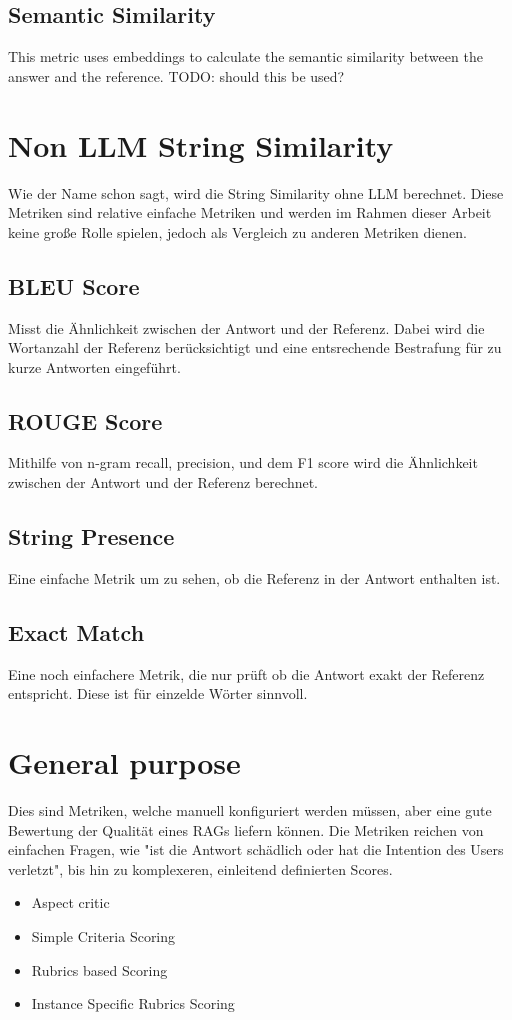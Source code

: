 \subsection{Semantic Similarity}
This metric uses embeddings to calculate the semantic similarity between the answer and the reference. TODO: should this be used?

\section{Non LLM String Similarity}
Wie der Name schon sagt, wird die String Similarity ohne LLM berechnet. Diese Metriken sind relative einfache Metriken und werden im Rahmen dieser Arbeit keine große Rolle spielen, jedoch als Vergleich zu anderen Metriken dienen.
\subsection{BLEU Score}
Misst die Ähnlichkeit zwischen der Antwort und der Referenz. Dabei wird die Wortanzahl der Referenz berücksichtigt und eine entsrechende Bestrafung für zu kurze Antworten eingeführt.
\subsection{ROUGE Score}
Mithilfe von n-gram recall, precision, und dem F1 score wird die Ähnlichkeit zwischen der Antwort und der Referenz berechnet.
\subsection{String Presence}
Eine einfache Metrik um zu sehen, ob die Referenz in der Antwort enthalten ist.
\subsection{Exact Match}
Eine noch einfachere Metrik, die nur prüft ob die Antwort exakt der Referenz entspricht. Diese ist für einzelde Wörter sinnvoll.

\section{General purpose}
Dies sind Metriken, welche manuell konfiguriert werden müssen, aber eine gute Bewertung der Qualität eines RAGs liefern können.
Die Metriken reichen von einfachen Fragen, wie "ist die Antwort schädlich oder hat die Intention des Users verletzt", bis hin zu komplexeren, einleitend definierten Scores.
\begin{itemize}
    \item Aspect critic
    \item Simple Criteria Scoring
    \item Rubrics based Scoring
    \item Instance Specific Rubrics Scoring
  \end{itemize}

